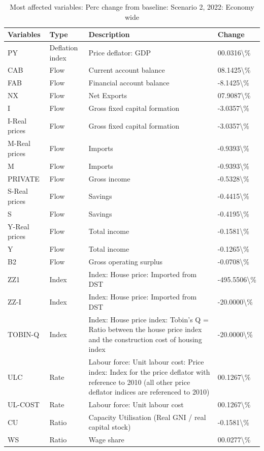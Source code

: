 \documentclass[
]{book}
\begin{document}
\begin{table}

\caption{\label{tab:most-affected-scenario-2-perc-economy}Most affected variables: Perc change from baseline: Scenario 2, 2022: Economy wide}
\centering
\fontsize{10}{12}\selectfont
\begin{tabular}[t]{l|l|l|l}
\hline
Variables & Type & Description & Change\\
\hline
PY & Deflation index & Price deflator: GDP & 00.0316\textbackslash{}\%\\
\hline
CAB & Flow & Current account balance & 08.1425\textbackslash{}\%\\
\hline
FAB & Flow & Financial account balance & -8.1425\textbackslash{}\%\\
\hline
NX & Flow & Net Exports & 07.9087\textbackslash{}\%\\
\hline
I & Flow & Gross fixed capital formation & -3.0357\textbackslash{}\%\\
\hline
I-Real prices & Flow & Gross fixed capital formation & -3.0357\textbackslash{}\%\\
\hline
M-Real prices & Flow & Imports & -0.9393\textbackslash{}\%\\
\hline
M & Flow & Imports & -0.9393\textbackslash{}\%\\
\hline
PRIVATE & Flow & Gross income & -0.5328\textbackslash{}\%\\
\hline
S-Real prices & Flow & Savings & -0.4415\textbackslash{}\%\\
\hline
S & Flow & Savings & -0.4195\textbackslash{}\%\\
\hline
Y-Real prices & Flow & Total income & -0.1581\textbackslash{}\%\\
\hline
Y & Flow & Total income & -0.1265\textbackslash{}\%\\
\hline
B2 & Flow & Gross operating surplus & -0.0708\textbackslash{}\%\\
\hline
ZZ1 & Index & Index: House price: Imported from DST & -495.5506\textbackslash{}\%\\
\hline
ZZ-I & Index & Index: House price: Imported from DST & -20.0000\textbackslash{}\%\\
\hline
TOBIN-Q & Index & Index: House price index: Tobin's Q = Ratio between the house price index and the construction cost of housing index & -20.0000\textbackslash{}\%\\
\hline
ULC & Rate & Labour force: Unit labour cost: Price index: Index for the price deflator with reference to 2010 (all other price deflator indices are referenced to 2010) & 00.1267\textbackslash{}\%\\
\hline
UL-COST & Rate & Labour force: Unit labour cost & 00.1267\textbackslash{}\%\\
\hline
CU & Ratio & Capacity Utilisation (Real GNI  /  real capital stock) & -0.1581\textbackslash{}\%\\
\hline
WS & Ratio & Wage share & 00.0277\textbackslash{}\%\\
\hline
\end{tabular}
\end{table}
\end{document}
